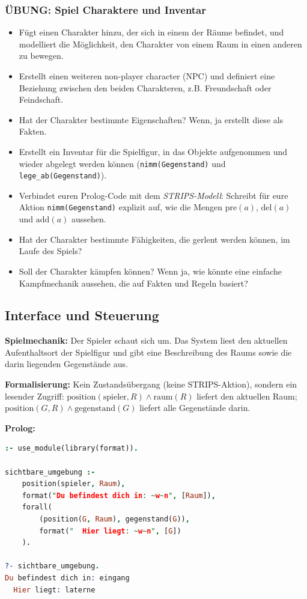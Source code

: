 \documentclass[parskip=half,a4paper,11pt]{scrreprt}
\begin{document}
\subsubsection{ÜBUNG: Spiel Charaktere und Inventar}
\begin{itemize}
    \item Fügt einen Charakter hinzu, der sich in einem der Räume befindet, und modelliert die Möglichkeit, den Charakter von einem Raum in einen anderen zu bewegen.
    \item Erstellt einen weiteren non-player character (NPC) und definiert eine Beziehung zwischen den beiden Charakteren, z.B. Freundschaft oder Feindschaft. 
    \item Hat der Charakter bestimmte Eigenschaften? Wenn, ja erstellt diese als Fakten.
    \item Erstellt ein Inventar für die Spielfigur, in das Objekte aufgenommen und wieder abgelegt werden können (\texttt{nimm(Gegenstand)} und \texttt{lege\_ab(Gegenstand)}).
    \item Verbindet euren Prolog-Code mit dem \textit{STRIPS-Modell}: Schreibt für eure Aktion \texttt{nimm(Gegenstand)} explizit auf, wie die Mengen $\text{pre}(a)$, $\text{del}(a)$ und $\text{add}(a)$ aussehen.
    \item Hat der Charakter bestimmte Fähigkeiten, die gerlent werden können, im Laufe des Spiels? 
    \item Soll der Charakter kämpfen können? Wenn ja, wie könnte eine einfache Kampfmechanik aussehen, die auf Fakten und Regeln basiert?
\end{itemize}

\subsection{Interface und Steuerung}

\textbf{Spielmechanik:} Der Spieler schaut sich um. Das System liest den aktuellen Aufenthaltsort der Spielfigur und gibt eine Beschreibung des Raums sowie die darin liegenden Gegenstände aus.

\textbf{Formalisierung:} Kein Zustandsübergang (keine STRIPS-Aktion), sondern ein lesender Zugriff: $\text{position}(\text{spieler}, R) \land \text{raum}(R)$ liefert den aktuellen Raum; $\text{position}(G, R) \land \text{gegenstand}(G)$ liefert alle Gegenstände darin.

\textbf{Prolog:}

\begin{lstlisting}[language=Prolog, caption={}]
% format/2 wird aus library(format) importiert
:- use_module(library(format)).

sichtbare_umgebung :-
    position(spieler, Raum),
    format("Du befindest dich in: ~w~n", [Raum]),
    forall(
        (position(G, Raum), gegenstand(G)),
        format("  Hier liegt: ~w~n", [G])
    ).

?- sichtbare_umgebung.
Du befindest dich in: eingang
  Hier liegt: laterne
\end{lstlisting}
\end{document}
